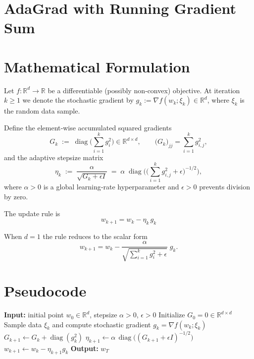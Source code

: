 \documentclass{article}
\newcommand{\R}{\mathbb{R}}
\begin{document}
\section*{AdaGrad with Running Gradient Sum}

\section*{Mathematical Formulation}
Let $f:\R^{d}\rightarrow\R$ be a differentiable (possibly non‑convex) objective.  
At iteration $k\ge 1$ we denote the stochastic gradient by $g_{k}:=\nabla f(w_{k};\xi_{k})\in\R^{d}$, where $\xi_{k}$ is the random data sample.  

Define the element‑wise accumulated squared gradients
\[
G_{k}\;:=\;\operatorname{diag}\!\Big(\sum_{i=1}^{k} g_{i}^{2}\Big)\in\R^{d\times d},
\qquad
\big(G_{k}\big)_{jj}= \sum_{i=1}^{k} g_{i,j}^{2},
\]
and the adaptive stepsize matrix
\[
\eta_{k}\;:=\;\frac{\alpha}{\sqrt{G_{k}+\epsilon I}}\;=\;\alpha\;\operatorname{diag}\!\Big(\big(\sum_{i=1}^{k} g_{i,j}^{2}+\epsilon\big)^{-1/2}\Big),
\]
where $\alpha>0$ is a global learning‑rate hyperparameter and $\epsilon>0$ prevents division by zero.

The update rule is
\[
\boxed{\;w_{k+1}=w_{k}-\eta_{k}\,g_{k}\; } \tag{1}
\]

When $d=1$ the rule reduces to the scalar form
\[
w_{k+1}=w_{k}-\frac{\alpha}{\sqrt{\sum_{i=1}^{k} g_{i}^{2}+\epsilon}}\;g_{k}.
\]

\section*{Pseudocode}
\begin{algorithm}[H]
\caption{AdaGrad (scalar / element‑wise)}\label{alg:adagrad}
\begin{algorithmic}[1]
\State \textbf{Input:} initial point $w_{0}\in\R^{d}$, stepsize $\alpha>0$, $\epsilon>0$
\State Initialize $G_{0}=0\in\R^{d\times d}$
    \State Sample data $\xi_{k}$ and compute stochastic gradient $g_{k}= \nabla f(w_{k};\xi_{k})$
    \State $G_{k+1}\gets G_{k}+ \operatorname{diag}(g_{k}^{2})$ 
    \State $\eta_{k+1}\gets \alpha\,\operatorname{diag}\!\big((G_{k+1}+\epsilon I)^{-1/2}\big)$
    \State $w_{k+1}\gets w_{k}-\eta_{k+1}g_{k}$ 
\EndFor
\State \textbf{Output:} $w_{T}$
\end{algorithmic}
\end{algorithm}
\end{document}
